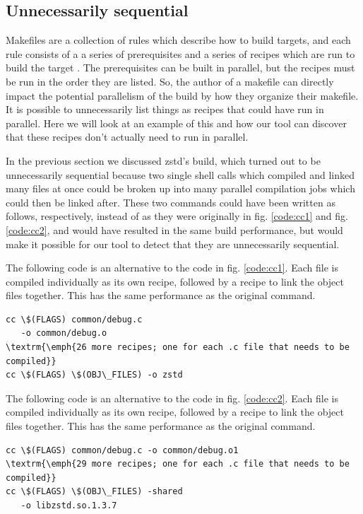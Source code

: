 \documentclass[sigconf,10pt,authorversion]{acmart}\settopmatter{printfolios=true,printccs=false,printacmref=false}
\begin{document}
\subsection{Unnecessarily sequential}
\label{sec:sequential}

Makefiles are a collection of rules which describe how to build targets,
and each rule consists
of a a series of prerequisites and a series of recipes which are run to build the target \cite{gnumakemanual}.  The
prerequisites can be built in parallel, but the recipes must be run in the order they are listed.  So,
the author of a makefile can directly impact the potential parallelism of the build by
how they organize their makefile.  It is possible to unnecessarily list things as recipes that
could have run in parallel.  Here we will look at an example of this and how our tool can
discover that these recipes don't actually need to run in parallel.

In the previous section we discussed zstd's build, which turned out to be unnecessarily sequential
because two single shell calls which compiled and linked many files at once could be broken up
into many parallel compilation jobs which could then be linked after.  These two commands could
have been written as follows, respectively, instead of as they were
originally in fig. \ref{code:cc1} and fig. \ref{code:cc2}, and would have resulted in the same
build performance, but would make it possible for our tool to detect that they are unnecessarily
sequential.

The following code is an alternative to the code in fig. \ref{code:cc1}. Each file is compiled individually
as its own recipe, followed by a recipe to link the object files together.  This has the same
performance as the original command.
  \begin{Verbatim}[commandchars=\\\{\},codes={\catcode`$=3\catcode`^=7\catcode`_=8},fontsize=\small]
cc \$(FLAGS) common/debug.c
   -o common/debug.o
\textrm{\emph{26 more recipes; one for each .c file that needs to be compiled}}
cc \$(FLAGS) \$(OBJ\_FILES) -o zstd
\end{Verbatim}
  
The following code is an alternative to the code in fig. \ref{code:cc2}. Each file is compiled individually
  as its own recipe, followed by a recipe to link the object files together.  This has the same
  performance as the original command.
  \begin{Verbatim}[commandchars=\\\{\},codes={\catcode`$=3\catcode`^=7\catcode`_=8},fontsize=\small]
cc \$(FLAGS) common/debug.c -o common/debug.o1
\textrm{\emph{29 more recipes; one for each .c file that needs to be compiled}}
cc \$(FLAGS) \$(OBJ\_FILES) -shared
   -o libzstd.so.1.3.7
\end{Verbatim}
\end{document}
